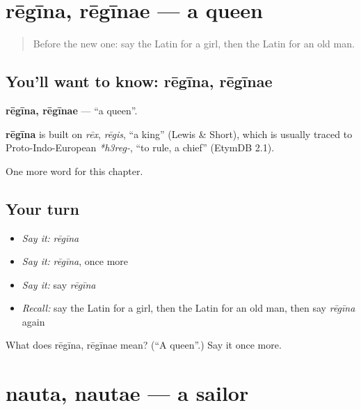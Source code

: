 \section[rēgīna, rēgīnae]{rēgīna, rēgīnae — a queen}

\label{lesson:LA-C73-regina}



\begin{quote}
Before the new one: say the Latin for a girl, then the Latin for an old man.
\end{quote}

\subsection*{You'll want to know: rēgīna, rēgīnae}
\textbf{rēgīna, rēgīnae} — \textquotedblleft{}a queen\textquotedblright{}.

\begin{cousinweb}
\textbf{rēgīna} is built on \emph{rēx}, \emph{rēgis}, \textquotedblleft{}a king\textquotedblright{} (Lewis \& Short), which is usually traced to Proto-Indo-European \emph{*h3reg-}, \textquotedblleft{}to rule, a chief\textquotedblright{} (EtymDB 2.1).
\end{cousinweb}

\begin{grammarlens}[title={What you've built}]
One more word for this chapter.
\end{grammarlens}

\subsection*{Your turn}
\begin{itemize}
\raggedright
  \item \emph{Say it:} \emph{rēgīna}
  \item \emph{Say it:} \emph{rēgīna}, once more
  \item \emph{Say it:} say \emph{rēgīna}
  \item \emph{Recall:} say the Latin for a girl, then the Latin for an old man, then say \emph{rēgīna} again
\end{itemize}

\begin{tcolorbox}[breakable,colback=teal!4,colframe=teal!35!black,title={Before you move on}]
What does rēgīna, rēgīnae mean? (\textquotedblleft{}A queen\textquotedblright{}.) Say it once more.
\end{tcolorbox}
\section[nauta, nautae]{nauta, nautae — a sailor}

